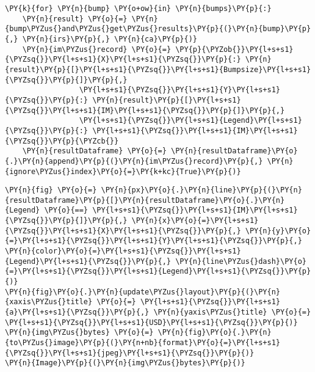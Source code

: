     \begin{tcolorbox}[breakable, size=fbox, boxrule=1pt, pad at break*=1mm,colback=cellbackground, colframe=cellborder]
\begin{Verbatim}[commandchars=\\\{\}]
\PY{k}{for} \PY{n}{bump} \PY{o+ow}{in} \PY{n}{bumps}\PY{p}{:}
    \PY{n}{result} \PY{o}{=} \PY{n}{bump\PYZus{}and\PYZus{}get\PYZus{}results}\PY{p}{(}\PY{n}{bump}\PY{p}{,} \PY{n}{irs}\PY{p}{,} \PY{n}{ca}\PY{p}{)}
    \PY{n}{im\PYZus{}record} \PY{o}{=} \PY{p}{\PYZob{}}\PY{l+s+s1}{\PYZsq{}}\PY{l+s+s1}{X}\PY{l+s+s1}{\PYZsq{}}\PY{p}{:} \PY{n}{result}\PY{p}{[}\PY{l+s+s1}{\PYZsq{}}\PY{l+s+s1}{Bumpsize}\PY{l+s+s1}{\PYZsq{}}\PY{p}{]}\PY{p}{,}
                 \PY{l+s+s1}{\PYZsq{}}\PY{l+s+s1}{Y}\PY{l+s+s1}{\PYZsq{}}\PY{p}{:} \PY{n}{result}\PY{p}{[}\PY{l+s+s1}{\PYZsq{}}\PY{l+s+s1}{IM}\PY{l+s+s1}{\PYZsq{}}\PY{p}{]}\PY{p}{,}
                 \PY{l+s+s1}{\PYZsq{}}\PY{l+s+s1}{Legend}\PY{l+s+s1}{\PYZsq{}}\PY{p}{:} \PY{l+s+s1}{\PYZsq{}}\PY{l+s+s1}{IM}\PY{l+s+s1}{\PYZsq{}}\PY{p}{\PYZcb{}}
    \PY{n}{resultDataframe} \PY{o}{=} \PY{n}{resultDataframe}\PY{o}{.}\PY{n}{append}\PY{p}{(}\PY{n}{im\PYZus{}record}\PY{p}{,} \PY{n}{ignore\PYZus{}index}\PY{o}{=}\PY{k+kc}{True}\PY{p}{)}
\end{Verbatim}
\end{tcolorbox}

    \begin{tcolorbox}[breakable, size=fbox, boxrule=1pt, pad at break*=1mm,colback=cellbackground, colframe=cellborder]
\begin{Verbatim}[commandchars=\\\{\}]
\PY{n}{fig} \PY{o}{=} \PY{n}{px}\PY{o}{.}\PY{n}{line}\PY{p}{(}\PY{n}{resultDataframe}\PY{p}{[}\PY{n}{resultDataframe}\PY{o}{.}\PY{n}{Legend} \PY{o}{==} \PY{l+s+s1}{\PYZsq{}}\PY{l+s+s1}{IM}\PY{l+s+s1}{\PYZsq{}}\PY{p}{]}\PY{p}{,} \PY{n}{x}\PY{o}{=}\PY{l+s+s1}{\PYZsq{}}\PY{l+s+s1}{X}\PY{l+s+s1}{\PYZsq{}}\PY{p}{,} \PY{n}{y}\PY{o}{=}\PY{l+s+s1}{\PYZsq{}}\PY{l+s+s1}{Y}\PY{l+s+s1}{\PYZsq{}}\PY{p}{,} \PY{n}{color}\PY{o}{=}\PY{l+s+s1}{\PYZsq{}}\PY{l+s+s1}{Legend}\PY{l+s+s1}{\PYZsq{}}\PY{p}{,} \PY{n}{line\PYZus{}dash}\PY{o}{=}\PY{l+s+s1}{\PYZsq{}}\PY{l+s+s1}{Legend}\PY{l+s+s1}{\PYZsq{}}\PY{p}{)}
\PY{n}{fig}\PY{o}{.}\PY{n}{update\PYZus{}layout}\PY{p}{(}\PY{n}{xaxis\PYZus{}title} \PY{o}{=} \PY{l+s+s1}{\PYZsq{}}\PY{l+s+s1}{a}\PY{l+s+s1}{\PYZsq{}}\PY{p}{,} \PY{n}{yaxis\PYZus{}title} \PY{o}{=} \PY{l+s+s1}{\PYZsq{}}\PY{l+s+s1}{USD}\PY{l+s+s1}{\PYZsq{}}\PY{p}{)}
\PY{n}{img\PYZus{}bytes} \PY{o}{=} \PY{n}{fig}\PY{o}{.}\PY{n}{to\PYZus{}image}\PY{p}{(}\PY{n+nb}{format}\PY{o}{=}\PY{l+s+s1}{\PYZsq{}}\PY{l+s+s1}{jpeg}\PY{l+s+s1}{\PYZsq{}}\PY{p}{)}
\PY{n}{Image}\PY{p}{(}\PY{n}{img\PYZus{}bytes}\PY{p}{)}
\end{Verbatim}
\end{tcolorbox}
 
